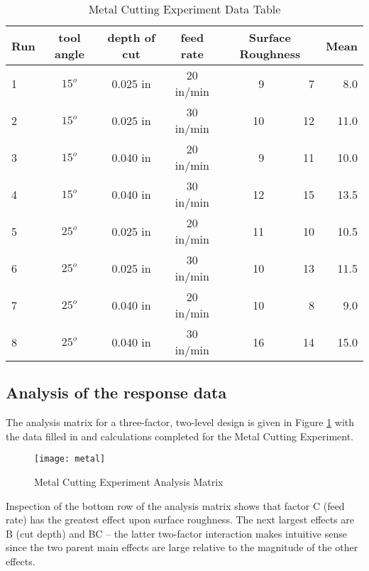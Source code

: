 \begin{table}[h]\caption{Metal Cutting Experiment Data Table}\label{tab6}
\begin{center}
\begin{tabular}{|l|c|c|c|r|r|r|}
\hline Run & \textbf{tool angle} & \textbf{depth of cut} & \textbf{feed rate} & \multicolumn{2}{c|}{\textbf{Surface Roughness}} & \textbf{Mean}\\ 
\hline 1 & $15^{o}$ & 0.025 in & 20 in/min &  9 &  7 &  8.0\\ 
\hline 2 & $15^{o}$ & 0.025 in & 30 in/min & 10 & 12 & 11.0\\ 
\hline 3 & $15^{o}$ & 0.040 in & 20 in/min &  9 & 11 & 10.0\\ 
\hline 4 & $15^{o}$ & 0.040 in & 30 in/min & 12 & 15 & 13.5\\
\hline 5 & $25^{o}$ & 0.025 in & 20 in/min & 11 & 10 & 10.5\\
\hline 6 & $25^{o}$ & 0.025 in & 30 in/min & 10 & 13 & 11.5\\
\hline 7 & $25^{o}$ & 0.040 in & 20 in/min & 10 &  8 &  9.0\\
\hline 8 & $25^{o}$ & 0.040 in & 30 in/min & 16 & 14 & 15.0\\ 
\hline 

\end{tabular} 
\end{center}
\end{table}
\subsection{Analysis of the response data}
The analysis matrix for a three-factor, two-level design is given in Figure \ref{fig5}  with the data filled in and calculations completed for the Metal Cutting Experiment.
\begin{figure}[h]\caption{Metal Cutting Experiment Analysis Matrix}\label{fig5}
\begin{center}
\texttt{[image: metal]}
\end{center}
\end{figure}
Inspection of the bottom row of the analysis matrix shows that factor C (feed rate) has the greatest effect upon surface roughness. The next largest effects are B (cut depth) and BC -- the latter two-factor interaction makes intuitive sense since the two parent main effects are large relative to the magnitude of the other effects.

